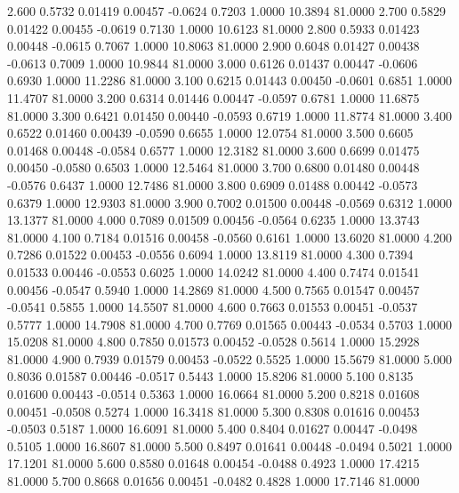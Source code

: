    2.600   0.5732   0.01419   0.00457  -0.0624   0.7203   1.0000  10.3894  81.0000
   2.700   0.5829   0.01422   0.00455  -0.0619   0.7130   1.0000  10.6123  81.0000
   2.800   0.5933   0.01423   0.00448  -0.0615   0.7067   1.0000  10.8063  81.0000
   2.900   0.6048   0.01427   0.00438  -0.0613   0.7009   1.0000  10.9844  81.0000
   3.000   0.6126   0.01437   0.00447  -0.0606   0.6930   1.0000  11.2286  81.0000
   3.100   0.6215   0.01443   0.00450  -0.0601   0.6851   1.0000  11.4707  81.0000
   3.200   0.6314   0.01446   0.00447  -0.0597   0.6781   1.0000  11.6875  81.0000
   3.300   0.6421   0.01450   0.00440  -0.0593   0.6719   1.0000  11.8774  81.0000
   3.400   0.6522   0.01460   0.00439  -0.0590   0.6655   1.0000  12.0754  81.0000
   3.500   0.6605   0.01468   0.00448  -0.0584   0.6577   1.0000  12.3182  81.0000
   3.600   0.6699   0.01475   0.00450  -0.0580   0.6503   1.0000  12.5464  81.0000
   3.700   0.6800   0.01480   0.00448  -0.0576   0.6437   1.0000  12.7486  81.0000
   3.800   0.6909   0.01488   0.00442  -0.0573   0.6379   1.0000  12.9303  81.0000
   3.900   0.7002   0.01500   0.00448  -0.0569   0.6312   1.0000  13.1377  81.0000
   4.000   0.7089   0.01509   0.00456  -0.0564   0.6235   1.0000  13.3743  81.0000
   4.100   0.7184   0.01516   0.00458  -0.0560   0.6161   1.0000  13.6020  81.0000
   4.200   0.7286   0.01522   0.00453  -0.0556   0.6094   1.0000  13.8119  81.0000
   4.300   0.7394   0.01533   0.00446  -0.0553   0.6025   1.0000  14.0242  81.0000
   4.400   0.7474   0.01541   0.00456  -0.0547   0.5940   1.0000  14.2869  81.0000
   4.500   0.7565   0.01547   0.00457  -0.0541   0.5855   1.0000  14.5507  81.0000
   4.600   0.7663   0.01553   0.00451  -0.0537   0.5777   1.0000  14.7908  81.0000
   4.700   0.7769   0.01565   0.00443  -0.0534   0.5703   1.0000  15.0208  81.0000
   4.800   0.7850   0.01573   0.00452  -0.0528   0.5614   1.0000  15.2928  81.0000
   4.900   0.7939   0.01579   0.00453  -0.0522   0.5525   1.0000  15.5679  81.0000
   5.000   0.8036   0.01587   0.00446  -0.0517   0.5443   1.0000  15.8206  81.0000
   5.100   0.8135   0.01600   0.00443  -0.0514   0.5363   1.0000  16.0664  81.0000
   5.200   0.8218   0.01608   0.00451  -0.0508   0.5274   1.0000  16.3418  81.0000
   5.300   0.8308   0.01616   0.00453  -0.0503   0.5187   1.0000  16.6091  81.0000
   5.400   0.8404   0.01627   0.00447  -0.0498   0.5105   1.0000  16.8607  81.0000
   5.500   0.8497   0.01641   0.00448  -0.0494   0.5021   1.0000  17.1201  81.0000
   5.600   0.8580   0.01648   0.00454  -0.0488   0.4923   1.0000  17.4215  81.0000
   5.700   0.8668   0.01656   0.00451  -0.0482   0.4828   1.0000  17.7146  81.0000
